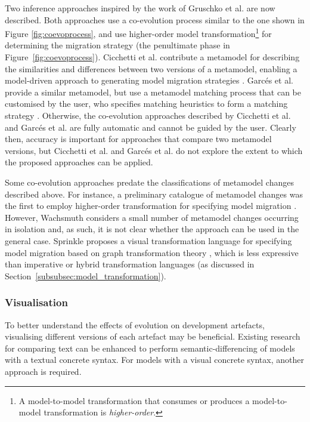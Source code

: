 Two \cc inference approaches inspired by the work of Gruschko et al. are now described. Both approaches use a co-evolution process similar to the one shown in Figure \ref{fig:coevoprocess}, and use higher-order model transformation\footnote{A model-to-model transformation that consumes or produces a model-to-model transformation is \emph{higher-order}.} for determining the migration strategy (the penultimate phase in Figure~\ref{fig:coevoprocess}). Cicchetti \cc et al. contribute a metamodel for describing the similarities and differences between two versions of a metamodel, enabling a model-driven approach to generating model migration strategies \cite{cicchetti08automating}. Garc\'{e}s \cc et al. provide a similar metamodel, but use a metamodel matching process that can be customised by the user, who specifies matching heuristics to form a matching strategy \cite{garces09managing}. Otherwise, the co-evolution approaches described by Cicchetti et al. and Garc\'{e}s et al. are fully automatic and cannot be guided by the user. Clearly \cc then, accuracy is important for approaches that compare two metamodel versions, but Cicchetti et al. and Garc\'{e}s et al. do not explore the extent to which the proposed approaches can be applied.

Some co-evolution approaches predate the classifications of metamodel changes described above. For instance, a \cc preliminary catalogue of metamodel changes was the first to employ higher-order transformation for specifying model migration \cite{wachsmuth07metamodel}. However, Wachsmuth \cc considers a small number of metamodel changes occurring in isolation and, as such, it is not clear whether the approach can be used in the general case. Sprinkle \cc proposes a visual transformation language for specifying model migration based on graph transformation theory \cite{sprinkle03thesis}, which is less expressive than imperative or hybrid transformation languages (as discussed in Section~\ref{subsubsec:model_transformation}).

\subsubsection{Visualisation}
To better understand the effects of evolution on development artefacts, visualising different versions of each artefact may be beneficial. Existing research for comparing text can be enhanced to perform semantic-differencing of models with a textual concrete syntax. For models with a visual concrete syntax, another approach is required. 

